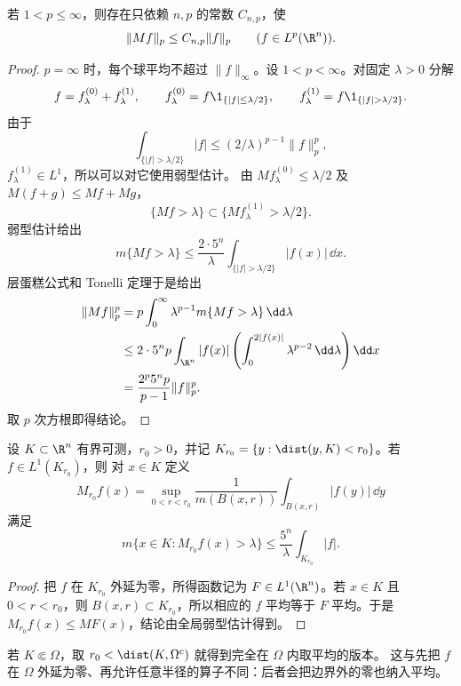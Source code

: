 \begin{proposition}[强型 $(p,p)$（选读）]\label{proposition:4-1-1-3}
若 $1<p\le\infty$，则存在只依赖 $n,p$ 的常数 $C_{n,p}$，使
\[
  \|Mf\|_p\le C_{n,p}\|f\|_p\qquad(f\in L^p(\R^n)).
\]
\end{proposition}

\begin{proof}
$p=\infty$ 时，每个球平均不超过 $\|f\|_\infty$。设 $1<p<\infty$。对固定
$\lambda>0$ 分解
 \[
 f=f_\lambda^{(0)}+f_\lambda^{(1)},\qquad
 f_\lambda^{(0)}=f\1_{\{|f|\le\lambda/2\}},\qquad
 f_\lambda^{(1)}=f\1_{\{|f|>\lambda/2\}}.
 \]
由于
\[
 \int_{\{|f|>\lambda/2\}}|f|
 \le (2/\lambda)^{p-1}\|f\|_p^p,
\]
$f_\lambda^{(1)}\in L^1$，所以可以对它使用弱型估计。
由 $M f_\lambda^{(0)}\le\lambda/2$ 及 $M(f+g)\le Mf+Mg$，
\[
 \{Mf>\lambda\}\subset
 \{M f_\lambda^{(1)}>\lambda/2\}.
\]
弱型估计给出
\[
 m\{Mf>\lambda\}
 \le\frac{2\cdot5^n}{\lambda}
       \int_{\{|f|>\lambda/2\}}|f(x)|\,\dd x.
\]
层蛋糕公式和 Tonelli 定理于是给出
\[
 \begin{aligned}
 \|Mf\|_p^p
 &=p\int_0^\infty\lambda^{p-1}m\{Mf>\lambda\}\,\dd\lambda\\
 &\le2\cdot5^np\int_{\R^n}|f(x)|
     \left(\int_0^{2|f(x)|}\lambda^{p-2}\,\dd\lambda\right)\dd x\\
 &=\frac{2^p5^np}{p-1}\|f\|_p^p.
 \end{aligned}
\]
取 $p$ 次方根即得结论。
\end{proof}

\begin{proposition}[局部极大函数]\label{proposition:4-1-1-4}
设 $K\subset\R^n$ 有界可测，$r_0>0$，并记
$K_{r_0}=\{y:\dist(y,K)<r_0\}$。若 $f\in L^1(K_{r_0})$，则
对 $x\in K$ 定义
\[
 M_{r_0}f(x)=\sup_{0<r<r_0}\frac1{m(B(x,r))}\int_{B(x,r)}|f(y)|\,\dd y
\]
满足
\[
 m\{x\in K:M_{r_0}f(x)>\lambda\}
 \le\frac{5^n}{\lambda}\int_{K_{r_0}}|f|.
\]
\end{proposition}

\begin{proof}
把 $f$ 在 $K_{r_0}$ 外延为零，所得函数记为 $F\in L^1(\R^n)$。若 $x\in K$ 且
$0<r<r_0$，则 $B(x,r)\subset K_{r_0}$，所以相应的 $f$ 平均等于 $F$ 平均。于是
$M_{r_0}f(x)\le MF(x)$，结论由全局弱型估计得到。
\end{proof}

若 $K\Subset\Omega$，取 $r_0<\dist(K,\Omega^c)$ 就得到完全在 $\Omega$ 内取平均的版本。
这与先把 $f$ 在 $\Omega$ 外延为零、再允许任意半径的算子不同：后者会把边界外的零也纳入平均。


